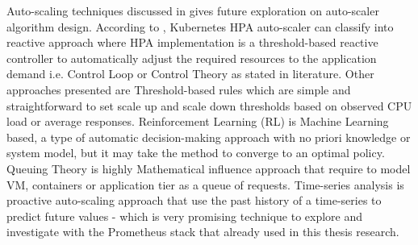 Auto-scaling techniques discussed in \parencite{LoridoBotran} gives future exploration on auto-scaler algorithm design. According to \parencite{LoridoBotran}, Kubernetes HPA auto-scaler can classify into reactive approach where HPA implementation is a threshold-based reactive controller to automatically adjust the required resources to the application demand i.e. Control Loop or Control Theory as stated in literature. Other approaches presented are Threshold-based rules which are simple and straightforward to set scale up and scale down thresholds based on observed CPU load or average responses. Reinforcement Learning (RL) is Machine Learning based, a type of automatic decision-making approach with no priori knowledge or system model, but it may take the method to converge to an optimal policy. Queuing Theory is highly Mathematical influence approach that require to model VM, containers or application tier as a queue of requests. Time-series analysis is proactive auto-scaling approach that use the past history of a time-series to predict future values - which is very promising technique to explore and investigate with the Prometheus stack that already used in this thesis research.







